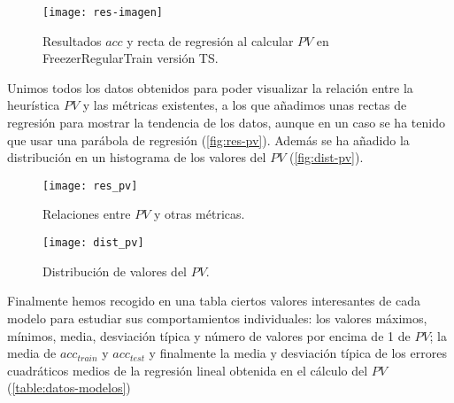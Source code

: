 \begin{figure}[htbp]
  \centering
  \texttt{[image: res-imagen]}
  \caption{Resultados $acc$ y recta de regresión al calcular $PV$ en FreezerRegularTrain versión TS.}
  \label{fig:res-imagen}
\end{figure}

Unimos todos los datos obtenidos para poder visualizar la relación entre la heurística $PV$ y las métricas existentes, a los que añadimos unas rectas de regresión para mostrar la tendencia de los datos, aunque en un caso se ha tenido que usar una parábola de regresión (\autoref{fig:res-pv}). Además se ha añadido la distribución en un histograma de los valores del $PV$ (\autoref{fig:dist-pv}).

\begin{figure}[htbp]
  \centering
  \hspace*{-1.2cm}
  \texttt{[image: res\_pv]}
  \caption{Relaciones entre $PV$ y otras métricas.}
  \label{fig:res-pv}
\end{figure}

\begin{figure}[htbp]
  \centering
  \texttt{[image: dist\_pv]}
  \caption{Distribución de valores del $PV$.}
  \label{fig:dist-pv}
\end{figure}

Finalmente hemos recogido en una tabla ciertos valores interesantes de cada modelo para estudiar sus comportamientos individuales: los valores máximos, mínimos, media, desviación típica y número de valores por encima de 1 de $PV$; la media de $acc_{train}$ y $acc_{test}$ y finalmente la media y desviación típica de los errores cuadráticos medios de la regresión lineal obtenida en el cálculo del $PV$ (\autoref{table:datos-modelos})

